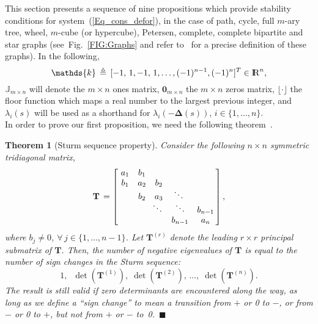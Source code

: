 \documentclass[letterpaper,9pt,twocolumn]{autart}
\newcommand{\rr}{\mathop{{\rm I}\mskip-4.0mu{\rm R}}\nolimits}
\newcommand{\vet}[1]{\ensuremath{{\mathbf #1}}}
\newtheorem{theorem}{\textbf{Theorem}} \newtheorem{proposition}{\textbf{Proposition}} \newtheorem{corollary}{\textbf{Corollary}}
\begin{document}
This section presents a sequence of nine propositions which provide stability conditions
for system~(\ref{Eq_cons_defor}), in the case of path, cycle, full $m$-ary tree, wheel, $m$-cube (or hypercube), Petersen, complete, complete bipartite and star graphs
(see~Fig.~\ref{FIG:Graphs} and refer to~\cite{GodsilRo_book01} for a precise definition of these graphs).
In the following, 
$$
\mathds{k} \,\triangleq\, [-1,\,1,-1,\,1,\ldots,(-1)^{n-1},(-1)^{n}]^T \in \rr^n,
$$ 
$\mathds{J}_{m \times n}$ will denote the $m \times n$ ones matrix, 
$\vet{0}_{m \times n}$ the $m \times n$ zeros matrix, 
$\lfloor \cdot \rfloor$ the floor function which maps a real number to the largest previous integer,
and $\lambda_i(s)$ will be used as a shorthand for 
$\lambda_i(-\boldsymbol{\Delta}(s))$, $i \in \{1,\ldots,n\}$.\\
\indent In order to prove our first proposition, we need the following theorem~\cite[Th.~8.5.1]{GolubLo_book96}.
\begin{theorem}[Sturm sequence property]\label{Theo_Sturm}
Consider the following $n \times n$ symmetric tridiagonal matrix,
$$
\vet{T} \,= \left[\,\,
            \begin{matrix}a_1 & b_1 & & &\\
              b_1 & a_2 & b_2 & &\vspace{-0.1cm}\\
                & b_2 & a_3 & \!\!\ddots &\vspace{-0.1cm}\\
                & & \!\!\ddots & \ddots & b_{n-1}\\
                & & & b_{n-1} & a_{n}
             \end{matrix}
          \,\right],
$$
where $b_j \neq 0$, $\forall\, j \in \{1,\ldots,n-1\}$. Let $\vet{T}^{(r)}$ denote the leading $r \times r$ principal submatrix of $\vet{T}$.
Then, the number of negative eigenvalues of $\vet{T}$
is equal to the number of sign changes in the \emph{Sturm sequence}:
$$
1,\;\;\det(\vet{T}^{(1)}),\;\det(\vet{T}^{(2)}),\,\ldots,\;\det(\vet{T}^{(n)}). $$
The result is still valid if zero determinants are encountered
along the way, as long as we define a ``sign change'' to mean a transition from $+$ or 0 to $-$,
or from $-$ or 0 to $+$, but not from $+$ or $-$ to~0.~\hfill$\blacksquare$
\end{theorem}
\end{document}
